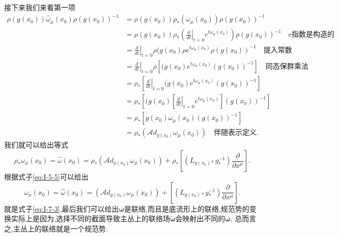 \documentclass[../main.tex]{subfiles}
\begin{document}
接下来我们来看第一项
\begin{align*}
  \rho(g(x_0)) \hat{\omega}_\mu(x_0)\rho(g(x_0))^{-1} &= \rho(g(x_0)) \rho_*(\omega_\mu(x_0)) \rho(g(x_0))^{-1} \\
                                                      & = \rho(g(x_0)) \rho_*(\left.\frac{d}{dt}\right|_{t = 0}e^{t \omega_\mu(x_0)} ) \rho(g(x_0))^{-1} \quad \text{e指数是构造的}\\
                                                      & =  \left.\frac{d}{dt}\right|_{t = 0} \rho(g(x_0)\rho e^{t \omega_\mu(x_0)}  \rho(g(x_0))^{-1} \quad \text{提入常数}\\
                                                      & =   \left.\frac{d}{dt}\right|_{t = 0} \rho[(g(x_0)e^{t \omega_\mu(x_0)} (g(x_0))^{-1} ] \quad\text{同态保群乘法}\\
                                                      & =  \rho_*[\left.\frac{d}{dt}\right|_{t = 0} (g(x_0)e^{t \omega_\mu(x_0)} (g(x_0))^{-1} ]\\
                                                      & = \rho_*\left[ (g(x_0)\left[\left.\frac{d}{dt}\right|_{t = 0}e^{t \omega_\mu(x_0)}\right] (g(x_0))^{-1} \right]\\
                                                      & = \rho_*[g(x_0)\omega_\mu(x_0)(g(x_0))^{-1}]\\
                                                      & = \rho_*(\mathscr{A}\!d_{g(x_0)}\omega_\mu(x_0))\quad \text{伴随表示定义}
.\end{align*}
我们就可以给出等式\[
\rho_* \omega_\mu(x_0)= \hat{\omega}(x_0) = \rho_*(\mathscr{A}\!d_{g(x_0)}\omega_\mu(x_0)) + \rho_*\left[ (L_{g(x_0)*} g^{-1}_*) \frac{\partial}{\partial x^\mu} \right]
.\] 
根据式子\ref{eq:I-5-5}可以给出\[
\omega_\mu(x_0)= \hat{\omega}(x_0) = (\mathscr{A}\!d_{g(x_0)}\omega_\mu(x_0)) + \left[ (L_{g(x_0)*} g^{-1}_*) \frac{\partial}{\partial x^\mu} \right]
.\] 
就是式子\ref{eq:I-7-3},最后我们可以给出$\bm{\omega}$是联络,而且是底流形上的联络,规范势的变换实际上是因为,选择不同的截面导致主丛上的联络场$\bm{\tilde{\omega}}$会映射出不同的$\bm{\omega} $,
总而言之,主丛上的联络就是一个规范势.
\end{document}
